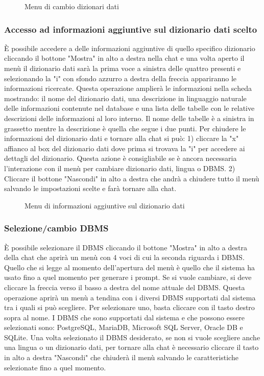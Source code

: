\begin{figure}[H]
  \centering
  \caption{Menu di cambio dizionari dati}
\end{figure}

\subsubsection{Accesso ad informazioni aggiuntive sul dizionario dati scelto}

È possibile accedere a delle informazioni aggiuntive di quello specifico dizionario cliccando il bottone "Mostra" in alto a destra nella chat e una volta aperto il menù il dizionario dati sarà la prima voce a sinistra delle quattro presenti e selezionando la "i" con sfondo azzurro a destra della freccia appariranno le informazioni ricercate. Questa operazione amplierà le informazioni nella scheda mostrando: il nome del dizionario dati, una descrizione in linguaggio naturale delle informazioni contenute nel database e una lista delle tabelle con le relative descrizioni delle informazioni al loro interno. Il nome delle tabelle è a sinistra in grassetto mentre la descrizione è quella che segue i due punti. Per chiudere le informazioni del dizionario dati e tornare alla chat si può: 1) cliccare la "x" affianco al box del dizionario dati dove prima si trovava la "i" per accedere ai dettagli del dizionario. Questa azione è consigliabile se è ancora necessaria l'interazione con il menù per cambiare dizionario dati, lingua o DBMS. 2) Cliccare il bottone "Nascondi" in alto a destra che andrà a chiudere tutto il menù salvando le impostazioni scelte e farà tornare alla chat.

\begin{figure}[H]
  \centering
  \caption{Menu di informazioni aggiuntive sul dizionario dati}
\end{figure}

\subsubsection{Selezione/cambio DBMS}

È possibile selezionare il DBMS cliccando il bottone "Mostra" in alto a destra della chat che aprirà un menù con 4 voci di cui la seconda riguarda i DBMS. Quello che si legge al momento dell'apertura del menù è quello che il sistema ha usato fino a quel momento per generare i prompt. Se si vuole cambiare, si deve cliccare la freccia verso il basso a destra del nome attuale del DBMS. Questa operazione aprirà un menù a tendina con i diversi DBMS supportati dal sistema tra i quali si può scegliere. Per selezionare uno, basta cliccare con il tasto destro sopra al nome. I DBMS che sono supportati dal sistema e che possono essere selezionati sono: PostgreSQL, MariaDB, Microsoft SQL Server, Oracle DB e SQLite. Una volta selezionato il DBMS desiderato, se non si vuole scegliere anche una lingua o un dizionario dati, per tornare alla chat è necessario cliccare il tasto in alto a destra "Nascondi" che chiuderà il menù salvando le caratteristiche selezionate fino a quel momento.

